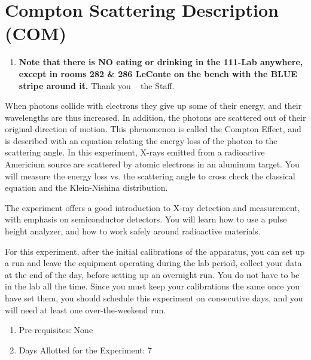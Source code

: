 \documentclass{../lab}
\begin{document}
\maketitle

\tableofcontents

\section{Compton Scattering Description (COM)}

\begin{enumerate}
    \item \textbf{Note that there is NO eating or drinking in the 111-Lab anywhere, except in rooms 282 \& 286 LeConte on the bench with the BLUE stripe around it.} Thank you -- the Staff.

\end{enumerate}

When photons collide with electrons they give up some of their energy, and their wavelengths are thus increased. In addition, the photons are scattered out of their original direction of motion. This phenomenon is called the Compton Effect, and is described with an equation relating the energy loss of the photon to the scattering angle. In this experiment, X-rays emitted from a radioactive Americium source are scattered by atomic electrons in an aluminum target. You will measure the energy loss vs. the scattering angle to cross check the classical equation and the Klein-Nishina distribution.

The experiment offers a good introduction to X-ray detection and measurement, with emphasis on semiconductor detectors. You will learn how to use a pulse height analyzer, and how to work safely around radioactive materials.

For this experiment, after the initial calibrations of the apparatus, you can set up a run and leave the equipment operating during the lab period, collect your data at the end of the day, before setting up an overnight run. You do not have to be in the lab all the time. Since you must keep your calibrations the same once you have set them, you should schedule this experiment on consecutive days, and you will need at least one over-the-weekend run.

\begin{enumerate}
    \item Pre-requisites: None

    \item Days Allotted for the Experiment: 7

\end{enumerate}
\end{document}
